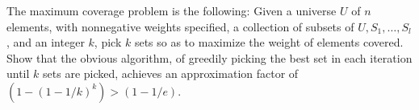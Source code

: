 \newpage
{} %

\problemdes

The maximum coverage problem is the following: Given a universe $U$ of $n$ elements, with nonnegative weights specified, a collection of subsets of $U, S_1, \dots,S_l$, and an integer $k$, pick $k$ sets so as to maximize the weight of elements covered. Show that the obvious algorithm, of greedily picking the best set in each iteration until $k$ sets are picked, achieves an approximation factor of $\left(1-(1-1 / k)^{k}\right)>(1-1 / e)$.

\solution











